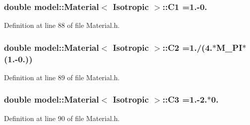 \hypertarget{classmodel_1_1_material_3_01_isotropic_01_4_a058681aa4f39d02334efb83c1eab8652}{}
\subsubsection[{C1}]{\setlength{\rightskip}{0pt plus 5cm}double {\bf model\+::\+Material}$<$ {\bf Isotropic} $>$\+::C1 =1.-\/0.\hspace{0.3cm}{\ttfamily [static]}}\label{classmodel_1_1_material_3_01_isotropic_01_4_a058681aa4f39d02334efb83c1eab8652}


Definition at line 88 of file Material.\+h.

\hypertarget{classmodel_1_1_material_3_01_isotropic_01_4_afbbc126d8ae1ba39a918cd2e1d5dd507}{}
\subsubsection[{C2}]{\setlength{\rightskip}{0pt plus 5cm}double {\bf model\+::\+Material}$<$ {\bf Isotropic} $>$\+::C2 =1./(4.$\ast$M\+\_\+\+P\+I$\ast$(1.-\/0.))\hspace{0.3cm}{\ttfamily [static]}}\label{classmodel_1_1_material_3_01_isotropic_01_4_afbbc126d8ae1ba39a918cd2e1d5dd507}


Definition at line 89 of file Material.\+h.

\hypertarget{classmodel_1_1_material_3_01_isotropic_01_4_a43f9ad024d3b9b4a03b52e2ffe02566c}{}
\subsubsection[{C3}]{\setlength{\rightskip}{0pt plus 5cm}double {\bf model\+::\+Material}$<$ {\bf Isotropic} $>$\+::C3 =1.-\/2.$\ast$0.\hspace{0.3cm}{\ttfamily [static]}}\label{classmodel_1_1_material_3_01_isotropic_01_4_a43f9ad024d3b9b4a03b52e2ffe02566c}


Definition at line 90 of file Material.\+h.

